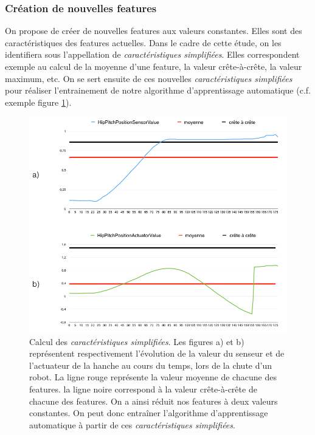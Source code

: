 \subsubsection{Création de nouvelles features}
\label{Automatisation du processus d'investigation: Reconnaissance de motifs: Différentes approches étudiées: Création de nouvelles features}
On propose de créer de nouvelles features aux valeurs constantes. Elles sont des caractéristiques des features actuelles. Dans le cadre de cette étude, on les identifiera sous l'appellation de \emph{caractéristiques simplifiées}. Elles correspondent exemple au calcul de la moyenne d'une feature, la valeur crête-à-crête, la valeur maximum, etc. On se sert ensuite de ces nouvelles \emph{caractéristiques simplifiées} pour réaliser l'entrainement de notre algorithme d'apprentissage automatique (c.f. exemple figure \ref{fig:Calcul de nouvelles features}).

\begin{figure}[h]
	\centering\includegraphics[width=12cm]{images/caracteristiques_simples_1.png}
	\caption[Calcul des caractéristiques simplifiées]{Calcul des \emph{caractéristiques simplifiées}. Les figures a) et b) représentent respectivement l'évolution de la valeur du senseur et de l'actuateur de la hanche au cours du temps, lors de la chute d'un robot. La ligne rouge représente la valeur moyenne de chacune des features. la ligne noire correspond à la valeur crête-à-crête de chacune des features. On a ainsi réduit nos features à deux valeurs constantes. On peut donc entraîner l'algorithme d'apprentissage automatique à partir de ces \emph{caractéristiques simplifiées}.}
	\label{fig:Calcul de nouvelles features}
\end{figure}

